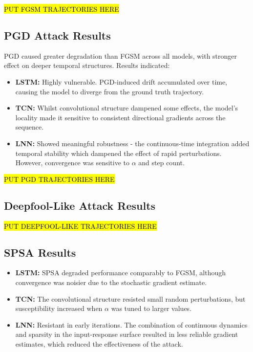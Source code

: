 \hl{PUT FGSM TRAJECTORIES HERE}

\subsection*{PGD Attack Results}

PGD caused greater degradation than FGSM across all models, with stronger effect on deeper temporal structures. Results indicated:
\begin{itemize}
    \item \textbf{LSTM:} Highly vulnerable. PGD-induced drift accumulated over time, causing the model to diverge from the ground truth trajectory.
    \item \textbf{TCN:} Whilst convolutional structure dampened some effects, the model's locality made it sensitive to consistent directional gradients across the sequence.
    \item \textbf{LNN:} Showed meaningful robustness - the continuous-time integration added temporal stability which dampened the effect of rapid perturbations. However, convergence was sensitive to $\alpha$ and step count.
\end{itemize}

\hl{PUT PGD TRAJECTORIES HERE}

\subsection*{Deepfool-Like Attack Results}

\hl{PUT DEEPFOOL-LIKE TRAJECTORIES HERE}

\subsection*{SPSA Results}

\begin{itemize}
    \item \textbf{LSTM:} SPSA degraded performance comparably to FGSM, although convergence was noisier due to the stochastic gradient estimate.
    \item \textbf{TCN:} The convolutional structure resisted small random perturbations, but susceptibility increased when $\alpha$ was tuned to larger values.
    \item \textbf{LNN:} Resistant in early iterations. The combination of continuous dynamics and sparsity in the input-response surface resulted in less reliable gradient estimates, which reduced the effectiveness of the attack.
\end{itemize}

